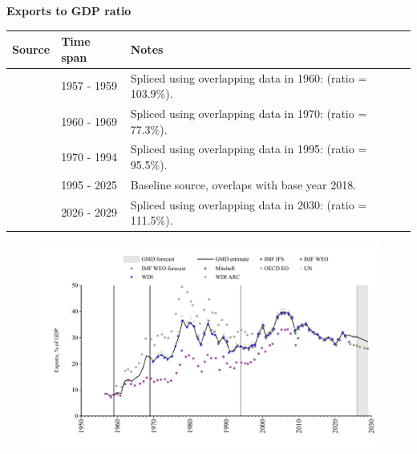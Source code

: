 \documentclass[12pt,a4paper,landscape]{article}
\begin{document}
\begin{adjustbox}{max totalsize={\paperwidth}{\paperheight},center}
\begin{minipage}[t][\textheight][t]{\textwidth}
\vspace*{0.5cm}
{}
\begin{center}
{\Large\bfseries Exports to GDP ratio}
\end{center}
\vspace{0.5cm}
\begin{table}[H]
\centering
\small
\begin{tabular}{|l|l|l|}
\hline
\textbf{Source} & \textbf{Time span} & \textbf{Notes} \\
\hline
\rowcolor{white}\cite{Mitchell}& 1957 - 1959 &Spliced using overlapping data in 1960: (ratio = 103.9\%). \\
\rowcolor{lightgray}\cite{WDI_ARC}& 1960 - 1969 &Spliced using overlapping data in 1970: (ratio = 77.3\%). \\
\rowcolor{white}\cite{UN}& 1970 - 1994 &Spliced using overlapping data in 1995: (ratio = 95.5\%). \\
\rowcolor{lightgray}\cite{OECD_EO}& 1995 - 2025 &Baseline source, overlaps with base year 2018. \\
\rowcolor{white}\cite{IMF_WEO_forecast}& 2026 - 2029 &Spliced using overlapping data in 2030: (ratio = 111.5\%). \\
\hline
\end{tabular}
\end{table}
\begin{figure}[H]
\centering
\includegraphics[width=\textwidth,height=0.6\textheight,keepaspectratio]{graphs/ISR_exports_GDP.pdf}
\end{figure}
\end{minipage}
\end{adjustbox}
\end{document}
